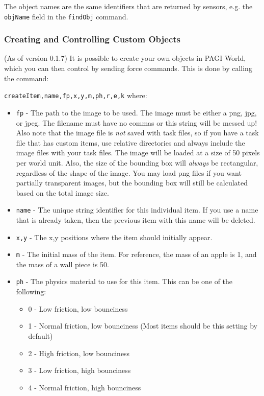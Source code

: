 The object names are the same identifiers that are returned by sensors, e.g. the \texttt{objName} field in the \texttt{findObj} command.

\subsubsection{Creating and Controlling Custom Objects}

(As of version 0.1.7) It is possible to create your own objects in PAGI World, which you can then control by sending force commands. This is done by calling the command:

\texttt{createItem,name,fp,x,y,m,ph,r,e,k} where:

\begin{itemize}
\item \texttt{fp} - The path to the image to be used. The image must be either a png, jpg, or jpeg. The filename must have no commas or this string will be messed up! Also note that the image file is \textit{not} saved with task files, so if you have a task file that has custom items, use relative directories and always include the image files with your task files. The image will be loaded at a size of 50 pixels per world unit. Also, the size of the bounding box will \textit{always} be rectangular, regardless of the shape of the image. You may load png files if you want partially transparent images, but the bounding box will still be calculated based on the total image size.
\item \texttt{name} - The unique string identifier for this individual item. If you use a name that is already taken, then the previous item with this name will be deleted.
\item \texttt{x,y} - The x,y positions where the item should initially appear.
\item \texttt{m} - The initial mass of the item. For reference, the mass of an apple is 1, and the mass of a wall piece is 50.
\item \texttt{ph} - The physics material to use for this item. This can be one of the following:
	\begin{itemize}
	\item 0 - Low friction, low bounciness
	\item 1 - Normal friction, low bounciness (Most items should be this setting by default)
	\item 2 - High friction, low bounciness
	\item 3 - Low friction, high bounciness
	\item 4 - Normal friction, high bounciness

\end{itemize}
\end{itemize}
